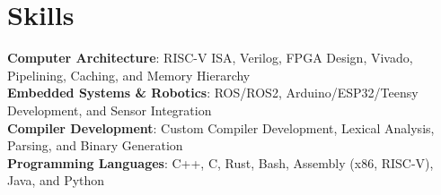 \section{Skills}
 \begin{itemize}[leftmargin=0.15in, label={}]
    \small{\item{
     \textbf{Computer Architecture}{: RISC-V ISA, Verilog, FPGA Design, Vivado, Pipelining, Caching, and Memory Hierarchy} \\
     \textbf{Embedded Systems \& Robotics}{: ROS/ROS2, Arduino/ESP32/Teensy Development, and Sensor Integration} \\
     \textbf{Compiler Development}{: Custom Compiler Development, Lexical Analysis, Parsing, and Binary Generation} \\
     \textbf{Programming Languages}{: C++, C, Rust, Bash, Assembly (x86, RISC-V), Java, and Python} \\
    }}
 \end{itemize}

